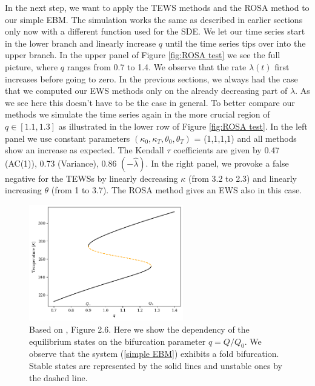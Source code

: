 \documentclass[%
thesis=student,%
coverpage=false,%
titlepage=false,%
headmarks=true, %
english,%
font=libertine, %
math=newpxtx, %
BCOR=5mm,%
coverBCOR=11mm%
]{tumbook}
\begin{document}
In the next step, we want to apply the TEWS methods and the ROSA method to our simple EBM.
The simulation works the same as described in earlier sections only now with a different function used for the SDE. We let our time series start in the lower branch and linearly increase $q$ until the time series tips over into the upper branch. In the upper panel of Figure \ref{fig:ROSA test} we see the full picture, where $q$ ranges from 0.7 to 1.4. We observe that the rate $\lambda(t)$ first increases before going to zero. In the previous sections, we always had the case that we computed our EWS methods only on the already decreasing part of $\lambda$. As we see here this doesn't have to be the case in general. To better compare our methods we simulate the time series again in the more crucial region of $q \in [1.1,1.3]$ as illustrated in the lower row of Figure \ref{fig:ROSA test}. In the left panel we use constant parameters $(\kappa_{0},\kappa_{T},\theta_{0},\theta_{T})$ = (1,1,1,1) and all methods show an increase as expected. The Kendall $\tau$ coefficients are given by 0.47 (AC(1)), 0.73 (Variance), 0.86 $(-\widehat{\lambda})$. In the right panel, we provoke a false negative for the TEWSs by linearly decreasing $\kappa$ (from 3.2 to 2.3) and linearly increasing $\theta$ (from 1 to 3.7). The ROSA method gives an EWS also in this case.

\begin{figure}[t]
    \centering
    \includegraphics[width=0.6\textwidth]{bachelor-thesis/figures/se_bif_plot.png}
    \caption{Based on \cite{Kaper:2013}, Figure 2.6. Here we show the dependency of the equilibrium states on the bifurcation parameter $q = Q/Q_{0}$. We observe that the system (\ref{simple EBM}) exhibits a fold bifurcation. Stable states are represented by the solid lines and unstable ones by the dashed line.}
    \label{fig:se_bif}
\end{figure}
\end{document}

